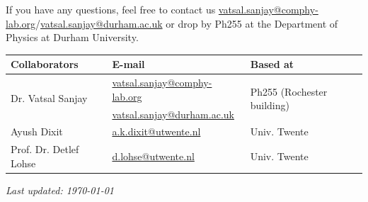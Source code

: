 \documentclass[11pt]{article}
\begin{document}
If you have any questions, feel free to contact us \href{mailto:vatsal.sanjay@comphy-lab.org}{vatsal.sanjay@comphy-lab.org}/\href{mailto:vatsal.sanjay@durham.ac.uk}{vatsal.sanjay@durham.ac.uk} or drop by Ph255 at the Department of Physics at Durham University.
\begin{center}
\begin{tabular}{|l|l|l|}
\hline \textbf{Collaborators} & \textbf{E-mail} & \textbf{Based at} \\
\hline \multirow{2}{*}{Dr. Vatsal Sanjay} & \href{mailto:vatsal.sanjay@comphy-lab.org}{vatsal.sanjay@comphy-lab.org} & \multirow{2}{*}{Ph255 (Rochester building)} \\
& \href{mailto:vatsal.sanjay@durham.ac.uk}{vatsal.sanjay@durham.ac.uk} & \\
\hline Ayush Dixit & \href{mailto:a.k.dixit@utwente.nl}{a.k.dixit@utwente.nl} & Univ. Twente \\
\hline Prof. Dr. Detlef Lohse & \href{mailto:d.lohse@utwente.nl}{d.lohse@utwente.nl} & Univ. Twente  \\
\hline
\end{tabular}
\end{center}

\vspace{1em}
\noindent\textit{Last updated: \today}

\printbibliography
\end{document}
